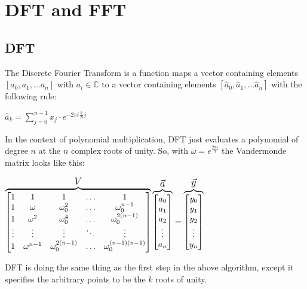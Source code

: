 \documentclass{article}
\begin{document}
\section{DFT and FFT}
\subsection{DFT}
The Discrete Fourier Transform is a function maps a vector containing elements $[a_0, a_1, ... a_n]$ with $a_i\in \mathbb{C}$ to a vector containing elements $[\hat{a}_0, \hat{a}_1, ... \hat{a}_n]$ with the following rule:

$\hat{a}_k = \displaystyle\sum\limits_{j=0}^{n-1} x_j\cdot e^{-2\pi i \frac{k}{N}j}$

In the context of polynomial multiplication, DFT just evaluates a polynomial of degree $n$ at the $n$ complex roots of unity. So, with $\omega = e^{\frac{2\pi i}{n}}$ the Vandermonde matrix looks like this:

\centerline{
    $
    \overbrace{
        \begin{bmatrix}
            1 & 1 & 1 & \ldots & 1 \\
            1 & \omega & \omega_0^2 & \ldots & \omega_0^{n-1} \\
            1 & \omega^2 & \omega_0^4 & \ldots & \omega_0^{2(n-1)} \\
            \vdots & \vdots & \vdots & \ddots & \vdots \\
            1 & \omega^{n-1} & \omega_0^{2(n-1)} & \ldots & \omega_0^{(n-1)(n-1)} \\
        \end{bmatrix}
    }^{\text{\large $V$}}
    \overbrace{
        \begin{bmatrix}
            a_0 \\ a_1 \\ a_2 \\ \vdots \\ a_n 
        \end{bmatrix}
    }^{\text{\large $\vec{a}$}} = 
    \overbrace{
        \begin{bmatrix}
            y_0 \\ y_1 \\ y_2 \\ \vdots \\ y_n 
        \end{bmatrix}
    }^{\text{\large $\vec{y}$}}
    $
}

DFT is doing the same thing as the first step in the above algorithm, except it specifies the arbitrary points to be the $k$ roots of unity.
\end{document}
